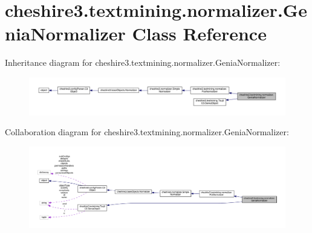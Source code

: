 \hypertarget{classcheshire3_1_1textmining_1_1normalizer_1_1_genia_normalizer}{\section{cheshire3.\-textmining.\-normalizer.\-Genia\-Normalizer Class Reference}
\label{classcheshire3_1_1textmining_1_1normalizer_1_1_genia_normalizer}
}


Inheritance diagram for cheshire3.\-textmining.\-normalizer.\-Genia\-Normalizer\-:
\nopagebreak
\begin{figure}[H]
\begin{center}
\leavevmode
\includegraphics[width=350pt]{classcheshire3_1_1textmining_1_1normalizer_1_1_genia_normalizer__inherit__graph}
\end{center}
\end{figure}


Collaboration diagram for cheshire3.\-textmining.\-normalizer.\-Genia\-Normalizer\-:
\nopagebreak
\begin{figure}[H]
\begin{center}
\leavevmode
\includegraphics[width=350pt]{classcheshire3_1_1textmining_1_1normalizer_1_1_genia_normalizer__coll__graph}
\end{center}
\end{figure}
